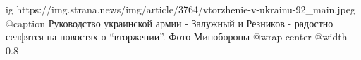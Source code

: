  
 
 
 
 

\ifcmt
  ig https://img.strana.news/img/article/3764/vtorzhenie-v-ukrainu-92_main.jpeg
  @caption Руководство украинской армии - Залужный и Резников - радостно селфятся на новостях о \enquote{вторжении}. Фото Минобороны 
  @wrap center
  @width 0.8
\fi
